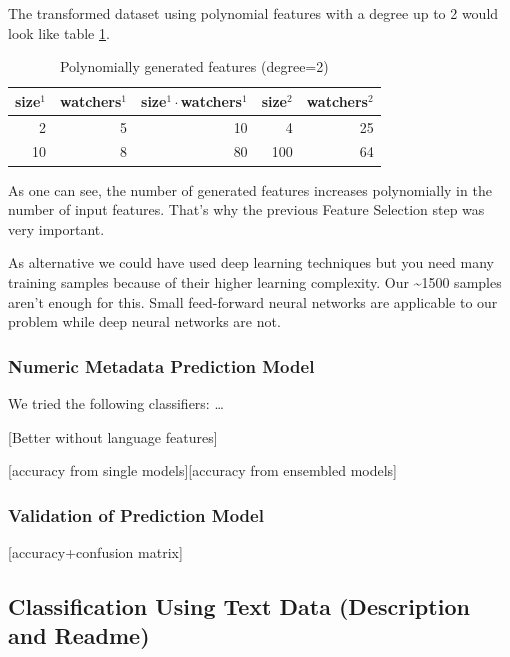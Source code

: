 \documentclass[a4paper,12pt]{article}
\begin{document}
The transformed dataset using polynomial features with a degree up to 2
would look like table \ref{example-feature-engineering-transformed}.

\begin{table}[]
\label{example-feature-engineering-transformed}
\centering
\caption{Polynomially generated features (degree=2)}
\begin{tabular}{|r|r|r|r|r|}
\hline
size$^1$ & watchers$^1$ & size$^1\cdot$watchers$^1$ & size$^2$ & watchers$^2$ \\ \hline
2 & 5 & 10 & 4 & 25 \\ \hline
10 & 8 & 80 & 100 & 64 \\ \hline
\end{tabular}
\end{table}

As one can see, the number of generated features increases polynomially
in the number of input features. That's why the previous Feature
Selection step was very important.

As alternative we could have used deep learning techniques but you need
many training samples because of their higher learning complexity. Our
\textasciitilde{}1500 samples aren't enough for this. Small feed-forward
neural networks are applicable to our problem while deep neural networks
are not.

\subsubsection{Numeric Metadata Prediction
Model}\label{numeric-metadata-prediction-model}

We tried the following classifiers: \ldots{}

{[}Better without language features{]}

{[}accuracy from single models{]}{[}accuracy from ensembled models{]}

\subsubsection{Validation of Prediction
Model}\label{validation-of-prediction-model}

{[}accuracy+confusion matrix{]}

\subsection{Classification Using Text Data (Description and
Readme)}\label{classification-using-text-data-description-and-readme}
\end{document}
